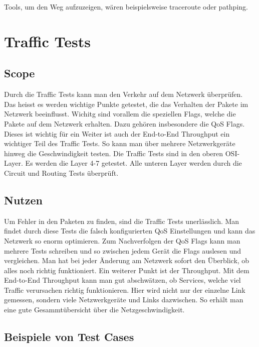 \documentclass[a4,12pt]{scrartcl}
\begin{document}
\noindent Tools, um den Weg aufzuzeigen, wären beispielsweise traceroute oder pathping.  
\section{Traffic Tests}
\subsection{Scope}
Durch die Traffic Tests kann man den Verkehr auf dem Netzwerk überprüfen. Das heisst es werden wichtige Punkte getestet, die das Verhalten der Pakete im Netzwerk beeinflusst. Wichitg sind vorallem die speziellen Flags, welche die Pakete auf dem Netzwerk erhalten. Dazu gehören insbesondere die QoS Flags. Dieses ist wichtig für ein \newline
Weiter ist auch der End-to-End Throughput ein wichtiger Teil des Traffic Tests. So kann man über mehrere Netzwerkgeräte hinweg die Geschwindigkeit testen.\newline\newline
Die Traffic Tests sind in den oberen OSI-Layer. Es werden die Layer 4-7 getestet. Alle unteren Layer werden durch die Circuit und Routing Tests überprüft.

\subsection{Nutzen}
Um Fehler in den Paketen zu finden, sind die Traffic Tests unerlässlich. Man findet durch diese Tests die falsch konfigurierten QoS Einstellungen und kann das Netzwerk so enorm optimieren. \newline
Zum Nachverfolgen der QoS Flags kann man mehrere Tests schreiben und so zwischen jedem Gerät die Flags auslesen und vergleichen.\newline\newline\newline
Man hat bei jeder Änderung am Netzwerk sofort den Überblick, ob alles noch richtig funktioniert.\newline\newline
Ein weiterer Punkt ist der Throughput. Mit dem End-to-End Throughput kann man gut abschwätzen, ob Services, welche viel Traffic verursachen richtig funktionieren. Hier wird nicht nur der einzelne Link gemessen, sondern viele Netzwerkgeräte und Links dazwischen. So erhält man eine gute Gesammtübersicht über die Netzgeschwindigkeit.

\subsection{Beispiele von Test Cases}
\end{document}
